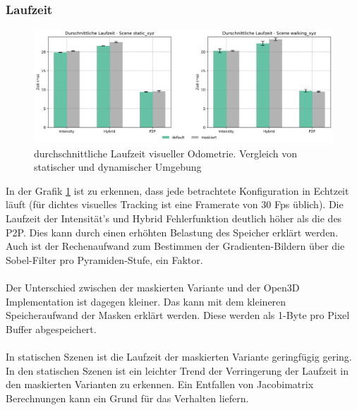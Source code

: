 \documentclass[12pt,DIV=15,BCOR=15mm,twoside,headsepline,abstract=true,listof=totoc,bibliography=totoc]{scrreprt}
\theoremstyle{remark}    %
\begin{document}
    \subsubsection{Laufzeit}
    \begin{figure}[h]
        \centering
        \includegraphics[width=\textwidth]{pics/odom_time_avg.png}
        \caption{durchschnittliche Laufzeit  visueller Odometrie. Vergleich von statischer und dynamischer Umgebung}
        \label{fig:avg_Laufzeit}
    \end{figure} \noindent
    In der Grafik \ref{fig:avg_Laufzeit} ist zu erkennen, dass jede betrachtete Konfiguration in Echtzeit läuft (für dichtes visuelles Tracking ist eine 
    Framerate von 30 Fps üblich).
    Die Laufzeit der Intensität's und Hybrid Fehlerfunktion deutlich höher als die des \ac{P2P}. Dies kann durch einen erhöhten Belastung des Speicher erklärt werden. 
    Auch ist der Rechenaufwand zum Bestimmen der Gradienten-Bildern über die Sobel-Filter pro Pyramiden-Stufe, ein Faktor.\\\\
    Der Unterschied zwischen der maskierten Variante und der Open3D Implementation ist dagegen kleiner. Das kann mit dem kleineren Speicheraufwand der Masken 
    erklärt werden. Diese werden als 1-Byte pro Pixel Buffer abgespeichert.\\\\
    In statischen Szenen ist die Laufzeit der maskierten Variante geringfügig gering. In den statischen Szenen ist ein leichter Trend der Verringerung der 
    Laufzeit in den maskierten Varianten zu erkennen. Ein Entfallen von Jacobimatrix Berechnungen kann ein Grund für das Verhalten liefern.
\end{document}
